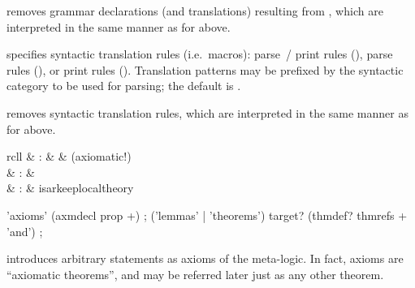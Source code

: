 \begin{isabellebody}
\begin{isamarkuptext}
\begin{descr}
  \item [\mbox{\isa{\isacommand{no{\isacharunderscore}syntax}}}~\isa{{\isachardoublequote}{\isacharparenleft}mode{\isacharparenright}\ decls{\isachardoublequote}}] removes
  grammar declarations (and translations) resulting from , which are interpreted in the same manner as for \mbox{} above.
  
  \item [\mbox{\isa{\isacommand{translations}}}~\isa{rules}] specifies syntactic
  translation rules (i.e.\ macros): parse~/ print rules (\isa{{\isachardoublequote}{\isasymrightleftharpoons}{\isachardoublequote}}),
  parse rules (\isa{{\isachardoublequote}{\isasymrightharpoonup}{\isachardoublequote}}), or print rules (\isa{{\isachardoublequote}{\isasymleftharpoondown}{\isachardoublequote}}).
  Translation patterns may be prefixed by the syntactic category to be
  used for parsing; the default is .
  
  \item [\mbox{\isa{\isacommand{no{\isacharunderscore}translations}}}~\isa{rules}] removes syntactic
  translation rules, which are interpreted in the same manner as for
  \mbox{} above.

  \end{descr}%
\end{isamarkuptext}%
\isamarkuptrue%
%
\isamarkuptrue%
%
\begin{isamarkuptext}%
\begin{matharray}{rcll}
    \mbox{} & : &  & (axiomatic!) \\
    \mbox{} & : &  \\
    \mbox{} & : & isarkeep{local{\dsh}theory} \\
  \end{matharray}

  \begin{rail}
    'axioms' (axmdecl prop +)
    ;
    ('lemmas' | 'theorems') target? (thmdef? thmrefs + 'and')
    ;
  \end{rail}

  \begin{descr}
  
  \item [\mbox{\isa{\isacommand{axioms}}}~\isa{{\isachardoublequote}a{\isacharcolon}\ {\isasymphi}{\isachardoublequote}}] introduces arbitrary
  statements as axioms of the meta-logic.  In fact, axioms are
  ``axiomatic theorems'', and may be referred later just as any other
  theorem.
  

\end{descr}
\end{isamarkuptext}
\end{isabellebody}

